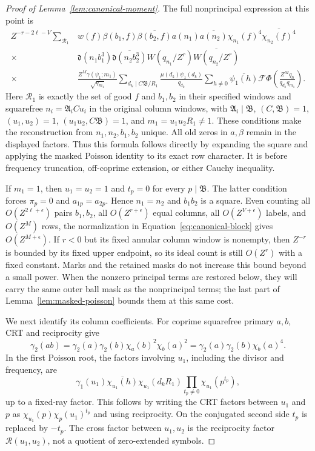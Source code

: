 \documentclass[12pt]{article}
\begin{document}
\begin{proof}[Proof of Lemma~\ref{lem:canonical-moment}]
The full nonprincipal expression at this point is
\begin{equation}\label{own:inverse-first-raw}
\begin{split}
 Z^{-r-2\ell-V}
 \sum_{\mathscr R_1}
 &w(f)\beta(b_1,f)\overline{\beta(b_2,f)}
 a(n_1)\overline{a(n_2)}
 \chi_{n_1}(f)^4\overline{\chi_{n_2}(f)^4}\\
 {}\times&
 \mathfrak d(n_1b_1^3)\overline{\mathfrak d(n_2b_2^3)}
 W(q_{n_1}/Z^r)\overline{W(q_{n_2}/Z^r)}\\
 {}\times&
 \frac{Z^M\gamma(\psi_1;m_1)}{\sqrt{q_{m_1}}}
 \sum_{d_k\mid C\mathfrak B/R_1}
       \frac{\mu(d_k)\psi_1(d_k)}{q_{d_k}}
 \sum_{h\ne0}\overline{\psi_1(h)}
       \mathcal F\Phi\!\left(\frac{Z^Mq_h}{q_{d_k}q_{m_1}}\right).
\end{split}
\end{equation}
Here \(\mathscr R_1\) is exactly the set of good \(f\) and
\(b_1,b_2\) in their specified windows and squarefree
\(n_i=\mathfrak A_iCu_i\) in the original column windows, with
\(\mathfrak A_i\mid\mathfrak B\), \((C,\mathfrak B)=1\),
\((u_1,u_2)=1\), \((u_1u_2,C\mathfrak B)=1\), and
\(m_1=u_1u_2R_1\ne1\).  These conditions make the reconstruction
from \(n_1,n_2,b_1,b_2\) unique.  All old zeros in \(a,\beta\)
remain in the displayed factors.  Thus this formula follows directly
by expanding the square and applying the masked Poisson identity
to its exact row character.  It is before frequency truncation,
off-coprime extension, or either Cauchy inequality.

If \(m_1=1\), then \(u_1=u_2=1\) and \(t_p=0\) for every
\(p\mid\mathfrak B\).  The latter condition forces \(\pi_p=0\)
and \(a_{1p}=a_{2p}\).  Hence \(n_1=n_2\) and \(b_1b_2\) is a
square.  Even counting all \(O(Z^{2\ell+\epsilon})\) pairs \(b_1,b_2\),
all \(O(Z^{r+\epsilon})\) equal columns, all \(O(Z^{V+\epsilon})\)
labels, and \(O(Z^M)\) rows, the normalization in
Equation~\eqref{eq:canonical-block} gives \(O(Z^{M+\epsilon})\).
If \(r<0\) but its fixed annular column window is nonempty, then
\(Z^{-r}\) is bounded by its fixed upper endpoint, so its ideal count
is still \(O(Z^r)\) with a fixed constant.
Marks and the retained masks do not increase this bound beyond a
small power.  When the nonzero principal terms are restored below, they
will carry the same outer ball mask as the nonprincipal terms; the last
part of Lemma~\ref{lem:masked-poisson} bounds them at this same cost.

We next identify its column coefficients.  For coprime squarefree primary \(a,b\),
CRT and reciprocity give
\[
 \gamma_2(ab)=\gamma_2(a)\gamma_2(b)
       \chi_a(b)^2\chi_b(a)^2
 =\gamma_2(a)\gamma_2(b)\chi_b(a)^4.
\]
In the first Poisson root, the factors involving \(u_1\), including
the divisor and frequency, are
\[
 \gamma_1(u_1)\overline{\chi_{u_1}(h)}
 \chi_{u_1}(d_kR_1)\prod_{t_p\ne0}\chi_{u_1}(p^{t_p}),
\]
up to a fixed-ray factor.  This follows by writing the CRT factors
between \(u_1\) and \(p\) as
\(\chi_{u_1}(p)\chi_p(u_1)^{t_p}\) and using reciprocity.  On the
conjugated second side \(t_p\) is replaced by \(-t_p\).  The cross
factor between \(u_1,u_2\) is the reciprocity factor
\(\mathcal R(u_1,u_2)\), not a quotient of zero-extended symbols.


\end{proof}
\end{document}
